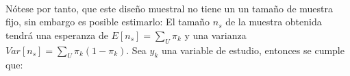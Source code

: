 \documentclass{article}
\begin{document}
    \paragraph{}
    Nótese por tanto, que este diseño muestral no tiene un un tamaño de muestra fijo, sin embargo es posible estimarlo: El tamaño $n_s$ de la muestra obtenida tendrá una esperanza de $E[n_s] = \sum_U\pi_k$ y una varianza $Var[n_s] = \sum_U \pi_k(1-\pi_k)$. Sea $y_k$ una variable de estudio, entonces se cumple que:



	\nocite{muest2017}

  
  
\end{document}
